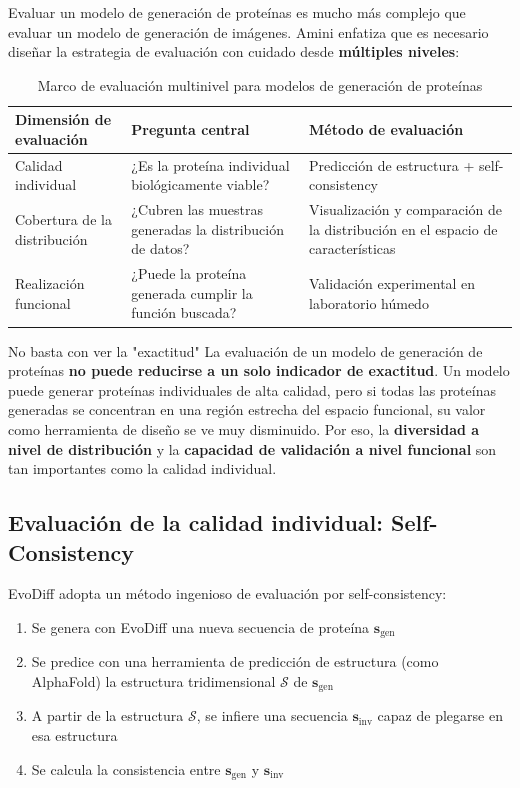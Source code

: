 \documentclass[a4paper]{article}
\begin{document}
Evaluar un modelo de generación de proteínas es mucho más complejo que evaluar un modelo de generación de imágenes. Amini enfatiza que es necesario diseñar la estrategia de evaluación con cuidado desde \textbf{múltiples niveles}:

\begin{table}[H]
\centering
\caption{Marco de evaluación multinivel para modelos de generación de proteínas}
\begin{tabular}{@{}lll@{}}
\toprule
\textbf{Dimensión de evaluación} & \textbf{Pregunta central} & \textbf{Método de evaluación} \\
\midrule
Calidad individual & ¿Es la proteína individual biológicamente viable? & Predicción de estructura + self-consistency \\
Cobertura de la distribución & ¿Cubren las muestras generadas la distribución de datos? & Visualización y comparación de la distribución en el espacio de características \\
Realización funcional & ¿Puede la proteína generada cumplir la función buscada? & Validación experimental en laboratorio húmedo \\
\bottomrule
\end{tabular}
\end{table}

\begin{warningbox}{No basta con ver la "exactitud"}
La evaluación de un modelo de generación de proteínas \textbf{no puede reducirse a un solo indicador de exactitud}. Un modelo puede generar proteínas individuales de alta calidad, pero si todas las proteínas generadas se concentran en una región estrecha del espacio funcional, su valor como herramienta de diseño se ve muy disminuido. Por eso, la \textbf{diversidad a nivel de distribución} y la \textbf{capacidad de validación a nivel funcional} son tan importantes como la calidad individual.
\end{warningbox}

\subsection{Evaluación de la calidad individual: Self-Consistency}

EvoDiff adopta un método ingenioso de evaluación por self-consistency:

\begin{enumerate}
    \item Se genera con EvoDiff una nueva secuencia de proteína $\mathbf{s}_{\text{gen}}$
    \item Se predice con una herramienta de predicción de estructura (como AlphaFold) la estructura tridimensional $\mathcal{S}$ de $\mathbf{s}_{\text{gen}}$
    \item A partir de la estructura $\mathcal{S}$, se infiere una secuencia $\mathbf{s}_{\text{inv}}$ capaz de plegarse en esa estructura
    \item Se calcula la consistencia entre $\mathbf{s}_{\text{gen}}$ y $\mathbf{s}_{\text{inv}}$
\end{enumerate}
\end{document}
